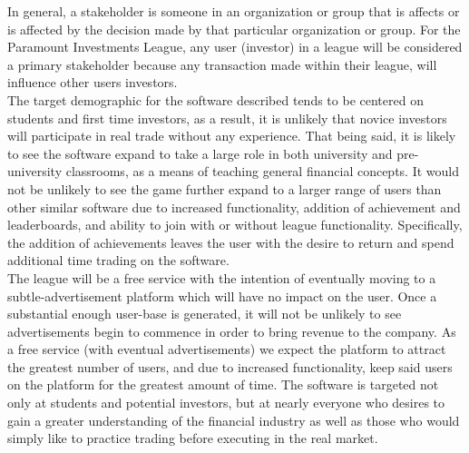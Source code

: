 In general, a stakeholder is someone in an organization or group that is affects or is affected by the decision made by that particular organization or group. For the Paramount Investments League, any user (investor) in a league will be considered a primary stakeholder because any transaction made within their league, will influence other users investors.\\

The target demographic for the software described tends to be centered on students and first time investors, as a result, it is unlikely that novice investors will participate in real trade without any experience. That being said, it is likely to see the software expand to take a large role in both university and pre-university classrooms, as a means of teaching general financial concepts. It would not be unlikely to see the game further expand to a larger range of users than other similar software due to increased functionality, addition of achievement and leaderboards, and ability to join with or without league functionality. Specifically, the addition of achievements leaves the user with the desire to return and spend additional time trading on the software.\\

The league will be a free service with the intention of eventually moving to a subtle-advertisement platform which will have no impact on the user. Once a substantial enough user-base is generated, it will not be unlikely to see advertisements begin to commence in order to bring revenue to the company. As a free service (with eventual advertisements) we expect the platform to attract the greatest number of users, and due to increased functionality, keep said users on the platform for the greatest amount of time. The software is targeted not only at students and potential investors, but at nearly everyone who desires to gain a greater understanding of the financial industry as well as those who would simply like to practice trading before executing in the real market.\\
